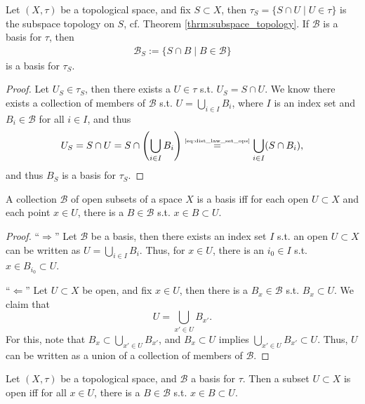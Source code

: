 \begin{theorem}\label{thrm:subspace_basis}
	Let $(X, \tau)$ be a topological space, and fix $S\subset X$, then 
	$\tau_S = \{S \cap U \mid U\in \tau\}$ is the subspace topology on $S$, cf. Theorem \ref{thrm:subspace_topology}. If $\mathscr B$ is a basis for $\tau$, then 
	\begin{align}
		\mathscr B_S := \{S \cap B \mid B\in\mathscr B\}
	\end{align}
	is a basis for $\tau_S$.
\end{theorem}

\begin{proof}
	Let $U_S \in \tau_S$, then there exists a $U\in \tau$ s.t. $U_S = S\cap U$. We know there exists a collection of members of $\mathscr B$ s.t. $U = \bigcup_{i\in I}B_i$, where $I$ is an index set and $B_i\in\mathscr B$ for all $i\in I$, and thus 
	$$U_S = S\cap U = S\cap \left(\bigcup_{i\in I}B_i\right) \overset{\tiny\eqref{eq:dist_law_set_ops}}{=} \bigcup_{i\in I}(S\cap B_i),$$
	and thus $B_S$ is a basis for $\tau_S$.
\end{proof}

\begin{theorem}\label{thrm:collection_of_subsets_basis}
	A collection $\mathscr B$ of open subsets of a space $X$ is a basis iff for each open $U\subset X$ and each point $x\in U$, there is a $B\in\mathscr B$ s.t. $x\in B\subset U$.
\end{theorem}

\begin{proof}
	\enquote{$\Longrightarrow$} Let $\mathscr B$ be a basis, then there exists an index set $I$ s.t. an open $U\subset X$ can be written as $U = \bigcup_{i\in I}B_i$. Thus, for $x\in U$, there is an $i_0\in I$ s.t. $x\in B_{i_0}\subset U$.
	
	\enquote{$\Longleftarrow$} Let $U\subset X$ be open, and fix $x\in U$, then there is a $B_x\in \mathscr B$ s.t. $B_x\subset U$. We claim that $$U = \bigcup_{x'\in U}B_{x'}.$$ For this, note that $B_x\subset \bigcup_{x'\in U}B_{x'}$, and $B_x\subset U$ implies $\bigcup_{x'\in U}B_{x'}\subset U$. Thus, $U$ can be written as a union of a collection of members of $\mathscr B$.
\end{proof}

\begin{corollary}\label{corollary:open_set_basis_member_containment}
	Let $(X, \tau)$ be a topological space, and $\mathscr B$ a basis for $\tau$. Then a subset $U\subset X$ is open iff for all $x\in U$, there is a $B\in\mathscr B$ s.t. $x\in B\subset U$.
\end{corollary}

